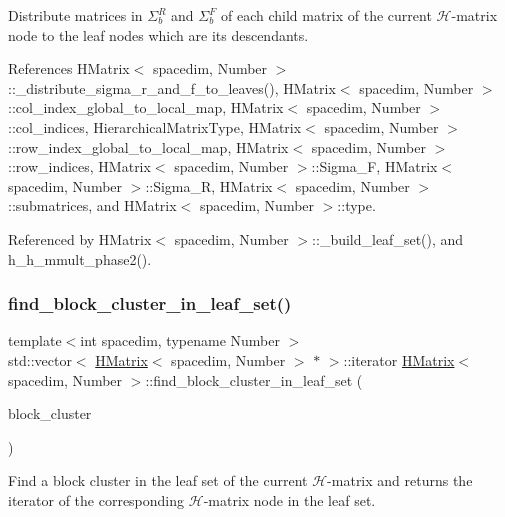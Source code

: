 Distribute matrices in $\Sigma_b^R$ and $\Sigma_b^F$ of each child matrix of the current $\mathcal{H}$-\/matrix node to the leaf nodes which are its descendants.

References H\+Matrix$<$ spacedim, Number $>$\+::\+\_\+distribute\+\_\+sigma\+\_\+r\+\_\+and\+\_\+f\+\_\+to\+\_\+leaves(), H\+Matrix$<$ spacedim, Number $>$\+::col\+\_\+index\+\_\+global\+\_\+to\+\_\+local\+\_\+map, H\+Matrix$<$ spacedim, Number $>$\+::col\+\_\+indices, Hierarchical\+Matrix\+Type, H\+Matrix$<$ spacedim, Number $>$\+::row\+\_\+index\+\_\+global\+\_\+to\+\_\+local\+\_\+map, H\+Matrix$<$ spacedim, Number $>$\+::row\+\_\+indices, H\+Matrix$<$ spacedim, Number $>$\+::\+Sigma\+\_\+F, H\+Matrix$<$ spacedim, Number $>$\+::\+Sigma\+\_\+R, H\+Matrix$<$ spacedim, Number $>$\+::submatrices, and H\+Matrix$<$ spacedim, Number $>$\+::type.



Referenced by H\+Matrix$<$ spacedim, Number $>$\+::\+\_\+build\+\_\+leaf\+\_\+set(), and h\+\_\+h\+\_\+mmult\+\_\+phase2().

\mbox{\label{classHMatrix_ab0f83de878e6079330ec3c374f587a04}} 
\subsubsection{\texorpdfstring{find\+\_\+block\+\_\+cluster\+\_\+in\+\_\+leaf\+\_\+set()}{find\_block\_cluster\_in\_leaf\_set()}\hspace{0.1cm}{\footnotesize\ttfamily [1/2]}}
{\footnotesize\ttfamily template$<$int spacedim, typename Number $>$ \\
std\+::vector$<$ \hyperlink{classHMatrix}{H\+Matrix}$<$ spacedim, Number $>$ $\ast$ $>$\+::iterator \hyperlink{classHMatrix}{H\+Matrix}$<$ spacedim, Number $>$\+::find\+\_\+block\+\_\+cluster\+\_\+in\+\_\+leaf\+\_\+set (\begin{DoxyParamCaption}\item[{const \hyperlink{classBlockCluster}{Block\+Cluster}$<$ spacedim, Number $>$ \&}]{block\+\_\+cluster }\end{DoxyParamCaption})}

Find a block cluster in the leaf set of the current $\mathcal{H}$-\/matrix and returns the iterator of the corresponding $\mathcal{H}$-\/matrix node in the leaf set.


